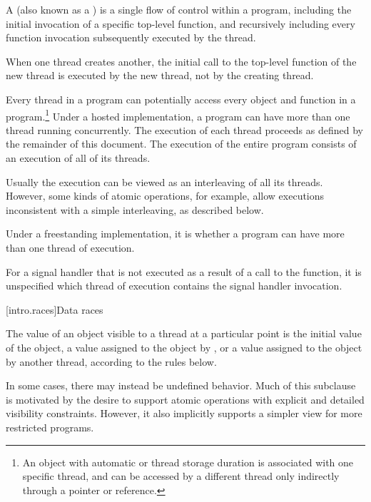 \pnum
{}%
%
A  (also known as a ) is a single flow of
control within a program, including the initial invocation of a specific
top-level function, and recursively including every function invocation
subsequently executed by the thread. \begin{note} When one thread creates another,
the initial call to the top-level function of the new thread is executed by the
new thread, not by the creating thread. \end{note} Every thread in a program can
potentially access every object and function in a program.\footnote{An object
with automatic or thread storage duration is associated with
one specific thread, and can be accessed by a different thread only indirectly
through a pointer or reference.} Under a hosted
implementation, a \Cpp{} program can have more than one thread running
concurrently. The execution of each thread proceeds as defined by the remainder
of this document. The execution of the entire program consists of an execution
of all of its threads. \begin{note} Usually the execution can be viewed as an
interleaving of all its threads. However, some kinds of atomic operations, for
example, allow executions inconsistent with a simple interleaving, as described
below. \end{note} Under a freestanding implementation, it is  whether a program can
have more than one thread of execution.

\pnum
For a signal handler that is not executed as a result of a call to the
 function, it is unspecified which thread of execution
contains the signal handler invocation.

[intro.races]{Data races}

\pnum
The value of an object visible to a thread  at a particular point is the
initial value of the object, a value assigned to the object by , or a
value assigned to the object by another thread, according to the rules below.
\begin{note} In some cases, there may instead be undefined behavior. Much of this
subclause is motivated by the desire to support atomic operations with explicit
and detailed visibility constraints. However, it also implicitly supports a
simpler view for more restricted programs. \end{note}

